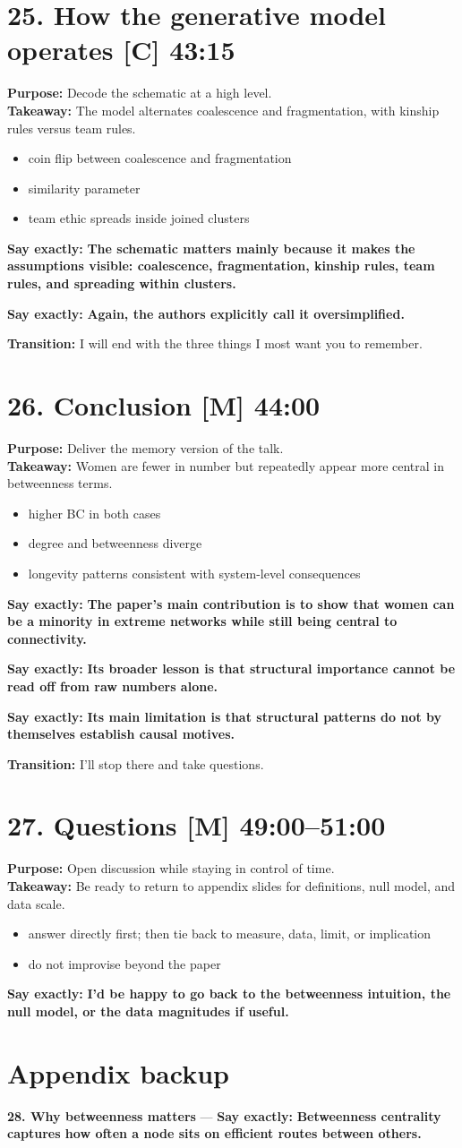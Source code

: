 \documentclass[11pt,a4paper]{article}
\newcommand{\slide}[4]{%
\section*{#1 \hfill {\normalsize #2}}
\textbf{Purpose:} #3\\
\textbf{Takeaway:} #4
}
\newcommand{\boldline}[1]{\par\textbf{Say exactly:} \textbf{#1}}
\newcommand{\transition}[1]{\par\textbf{Transition:} #1}
\newcommand{\labelbox}[1]{\textbf{[#1]}}
\begin{document}
\slide{25. How the generative model operates \labelbox{C}}{43:15}{Decode the schematic at a high level.}{The model alternates coalescence and fragmentation, with kinship rules versus team rules.}
\begin{itemize}
\item coin flip between coalescence and fragmentation
\item similarity parameter
\item team ethic spreads inside joined clusters
\end{itemize}
\boldline{The schematic matters mainly because it makes the assumptions visible: coalescence, fragmentation, kinship rules, team rules, and spreading within clusters.}
\boldline{Again, the authors explicitly call it oversimplified.}
\transition{I will end with the three things I most want you to remember.}

\slide{26. Conclusion \labelbox{M}}{44:00}{Deliver the memory version of the talk.}{Women are fewer in number but repeatedly appear more central in betweenness terms.}
\begin{itemize}
\item higher BC in both cases
\item degree and betweenness diverge
\item longevity patterns consistent with system-level consequences
\end{itemize}
\boldline{The paper’s main contribution is to show that women can be a minority in extreme networks while still being central to connectivity.}
\boldline{Its broader lesson is that structural importance cannot be read off from raw numbers alone.}
\boldline{Its main limitation is that structural patterns do not by themselves establish causal motives.}
\transition{I’ll stop there and take questions.}

\slide{27. Questions \labelbox{M}}{49:00--51:00}{Open discussion while staying in control of time.}{Be ready to return to appendix slides for definitions, null model, and data scale.}
\begin{itemize}
\item answer directly first; then tie back to measure, data, limit, or implication
\item do not improvise beyond the paper
\end{itemize}
\boldline{I’d be happy to go back to the betweenness intuition, the null model, or the data magnitudes if useful.}

\section*{Appendix backup}
\textbf{28. Why betweenness matters} --- \textbf{Say exactly:} \textbf{Betweenness centrality captures how often a node sits on efficient routes between others.}
\end{document}
